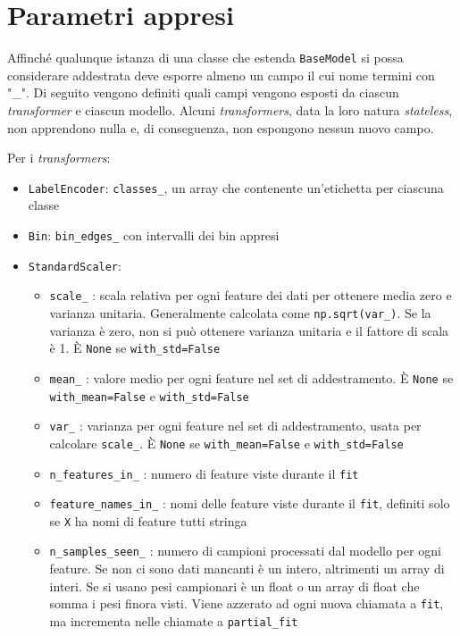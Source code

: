 \section{Parametri appresi}

Affinché qualunque istanza di una classe che estenda \texttt{BaseModel} si possa considerare addestrata deve esporre almeno un campo il cui nome termini con "\_". Di seguito vengono definiti quali campi vengono esposti da ciascun \textit{transformer} e ciascun modello. Alcuni \textit{transformers}, data la loro natura \textit{stateless}, non apprendono nulla e, di conseguenza, non espongono nessun nuovo campo.

Per i \textit{transformers}:

\begin{itemize}
    \item \texttt{LabelEncoder}: \texttt{classes\_}, un array che contenente un'etichetta per ciascuna classe
    \item \texttt{Bin}: \texttt{bin\_edges\_} con intervalli dei bin appresi
    \item \texttt{StandardScaler}:
    \begin{itemize}
        \item \texttt{scale\_} : scala relativa per ogni feature dei dati per ottenere media zero e varianza unitaria. Generalmente calcolata come \texttt{np.sqrt(var\_)}. Se la varianza è zero, non si può ottenere varianza unitaria e il fattore di scala è 1. È \texttt{None} se \texttt{with\_std=False}
        \item \texttt{mean\_} : valore medio per ogni feature nel set di addestramento. È \texttt{None} se \texttt{with\_mean=False} e \texttt{with\_std=False}
        \item \texttt{var\_} : varianza per ogni feature nel set di addestramento, usata per calcolare \texttt{scale\_}. È \texttt{None} se \texttt{with\_mean=False} e \texttt{with\_std=False}
        \item \texttt{n\_features\_in\_} : numero di feature viste durante il \texttt{fit}
        \item \texttt{feature\_names\_in\_} : nomi delle feature viste durante il \texttt{fit}, definiti solo se \texttt{X} ha nomi di feature tutti stringa
        \item \texttt{n\_samples\_seen\_} : numero di campioni processati dal modello per ogni feature. Se non ci sono dati mancanti è un intero, altrimenti un array di interi. Se si usano pesi campionari è un float o un array di float che somma i pesi finora visti. Viene azzerato ad ogni nuova chiamata a \texttt{fit}, ma incrementa nelle chiamate a \texttt{partial\_fit}

\end{itemize}
\end{itemize}
